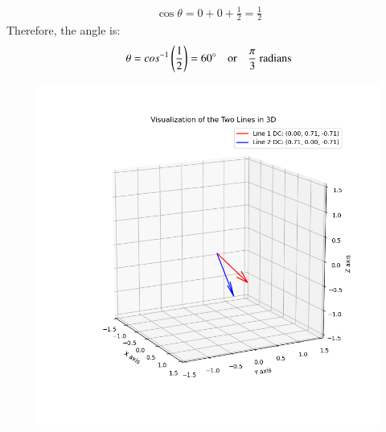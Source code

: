 \documentclass[journal]{IEEEtran}
\begin{document}
\begin{align}
\cos \theta = 0 + 0 + \frac{1}{2} = \frac{1}{2}
\end{align}
Therefore, the angle is:
\begin{align}
\theta = cos^{-1}\left(\frac{1}{2}\right) = 60^{\circ} \quad \text{or} \quad \frac{\pi}{3} \text{ radians}
\end{align}
\newpage
 \begin{figure}
    \centering
    \includegraphics[width=0.9\columnwidth]{figs/Figure_1.png}
    \label{fig:placeholder}
\end{figure}
\end{document}
